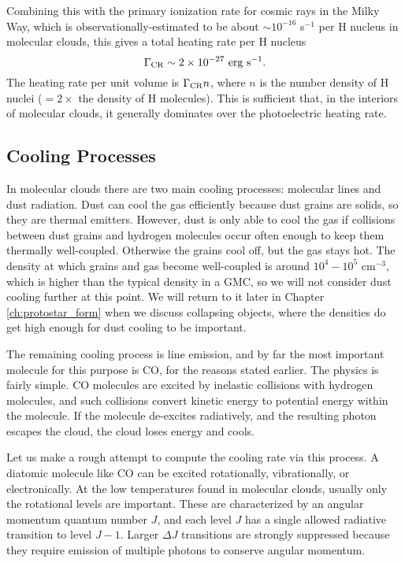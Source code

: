 Combining this with the primary ionization rate for cosmic rays in the Milky Way, which is observationally-estimated to be about  $\sim 10^{-16}$ s$^{-1}$ per H nucleus in molecular clouds, this gives a total heating rate per H nucleus
\begin{equation}
\Gamma_{\rm CR} \sim 2\times 10^{-27}\mbox{ erg s}^{-1}.
\end{equation}
The heating rate per unit volume is $\Gamma_{\rm CR} n$, where $n$ is the number density of H nuclei ($=2\times$ the density of H molecules). This is sufficient that, in the interiors of molecular clouds, it generally dominates over the photoelectric heating rate.

\subsection{Cooling Processes}

In molecular clouds there are two main cooling processes: molecular lines and dust radiation. Dust can cool the gas efficiently because dust grains are solids, so they are thermal emitters. However, dust is only able to cool the gas if collisions between dust grains and hydrogen molecules occur often enough to keep them thermally well-coupled. Otherwise the grains cool off, but the gas stays hot. The density at which grains and gas become well-coupled is around $10^4-10^5$ cm$^{-3}$, which is higher than the typical density in a GMC, so we will not consider dust cooling further at this point. We will return to it later in Chapter \ref{ch:protostar_form} when we discuss collapsing objects, where the densities do get high enough for dust cooling to be important.

The remaining cooling process is line emission, and by far the most important molecule for this purpose is CO, for the reasons stated earlier. The physics is fairly simple. CO molecules are excited by inelastic collisions with hydrogen molecules, and such collisions convert kinetic energy to potential energy within the molecule. If the molecule de-excites radiatively, and the resulting photon escapes the cloud, the cloud loses energy and cools.

Let us make a rough attempt to compute the cooling rate via this process. A diatomic molecule like CO can be excited rotationally, vibrationally, or electronically. At the low temperatures found in molecular clouds, usually only the rotational levels are important. These are characterized by an angular momentum quantum number $J$, and each level $J$ has a single allowed radiative transition to level $J-1$. Larger $\Delta J$ transitions are strongly suppressed because they require emission of multiple photons to conserve angular momentum.


